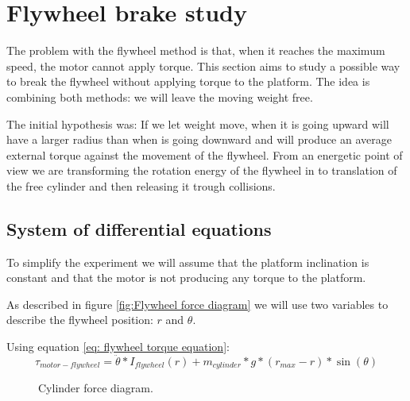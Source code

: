\section{Flywheel brake study}

The problem with the flywheel method is that, when it reaches the maximum speed, the motor cannot apply torque. 
This section aims to study a possible way to break the flywheel without applying torque to the platform.
The idea is combining both methods: we will leave the moving weight free.

The initial hypothesis was: If we let weight move, when it is going upward will have a larger radius than 
when is going downward and will produce an average external torque against 
the movement of the flywheel. From an energetic point of view we are transforming the rotation energy of
the flywheel in to translation of the free cylinder and then releasing it trough collisions.

\subsection{System of differential equations}
To simplify the experiment we will assume that the platform inclination is constant and that the motor is not
producing any torque to the platform.

As described in figure \ref{fig:Flywheel force diagram} we will use two variables to describe
the flywheel position: $r$ and $\theta$.

Using equation \ref{eq: flywheel torque equation}:
\[\tau_{motor-flywheel} = \ddot{\theta}*I_{flywheel}(r) + m_{cylinder} * g * 
(r_{max} - r) * \sin({\theta})  \]
\begin{figure}[H]
	\centering
	\caption{Cylinder force diagram.}
	\label{fig:Cylinder force diagram}
\end{figure}

